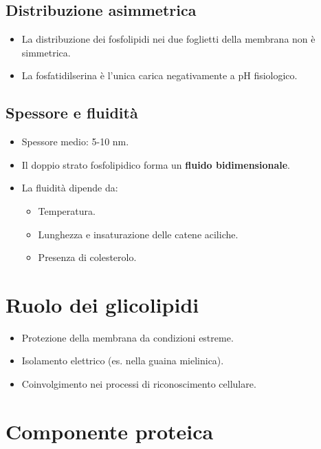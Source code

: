 \documentclass[a4paper,12pt]{article}
\begin{document}
\subsection*{Distribuzione asimmetrica}

\begin{itemize}
    \item La distribuzione dei fosfolipidi nei due foglietti della membrana non è simmetrica.
    \item La fosfatidilserina è l’unica carica negativamente a pH fisiologico.
\end{itemize}

\subsection*{Spessore e fluidità}
\begin{itemize}
    \item Spessore medio: 5-10 nm.
    \item Il doppio strato fosfolipidico forma un \textbf{fluido bidimensionale}.
    \item La fluidità dipende da:
    \begin{itemize}
        \item Temperatura.
        \item Lunghezza e insaturazione delle catene aciliche.
        \item Presenza di colesterolo.
    \end{itemize}
\end{itemize}

\section*{Ruolo dei glicolipidi}

\begin{itemize}
    \item Protezione della membrana da condizioni estreme.
    \item Isolamento elettrico (es. nella guaina mielinica).
    \item Coinvolgimento nei processi di riconoscimento cellulare.
\end{itemize}

\section*{Componente proteica}
\end{document}
